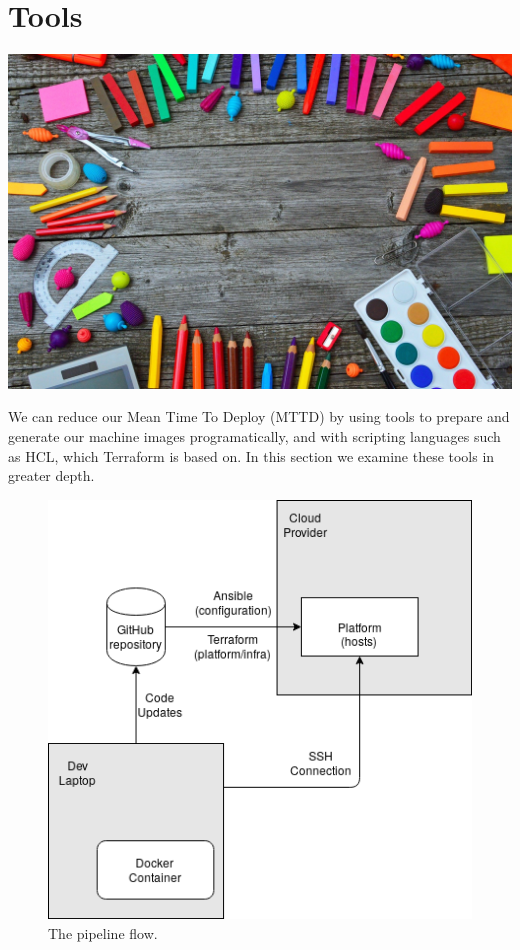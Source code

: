 \chapter{Tools}

\includegraphics{images/school-tools-3596680_1920.jpg}

We can reduce our Mean Time To Deploy (MTTD)
by using tools to prepare and generate our machine images
programatically, and with scripting languages such as HCL, which
Terraform
is based on. In this section we examine these tools in greater depth.

\begin{figure}
   \centering
   \includegraphics{images/infra_flow.png}
   \caption{The pipeline flow.}
  \label{infraflow}
\end{figure}

